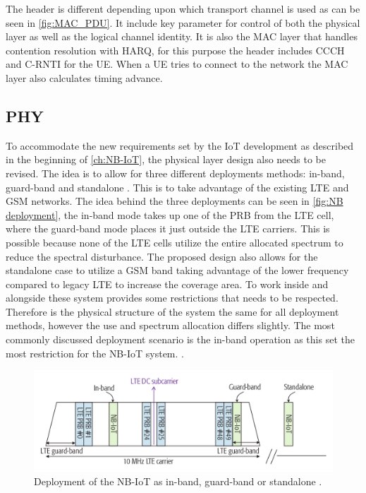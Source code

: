 The header is different depending upon which transport channel is used as can be seen in \autoref{fig:MAC_PDU}. It include key parameter for control of both the physical layer as well as the logical channel identity. It is also the \gls{MAC} layer that handles contention resolution with \gls{HARQ}, for this purpose the header includes \gls{CCCH} and \gls{C-RNTI} for the \gls{UE}. When a \gls{UE} tries to connect to the network the \gls{MAC} layer also calculates timing advance. 


\subsection{PHY}\label{sec:NB-IoT/Physical Layer}

To accommodate the new requirements set by the \gls{IoT} development as described in the beginning of \autoref{ch:NB-IoT}, the physical layer design also needs to be revised. The idea is to allow for three different deployments methods: in-band, guard-band and standalone \citep{primer}. This is to take advantage of the existing \gls{LTE} and \gls{GSM} networks. The idea behind the three deployments can be seen in \autoref{fig:NB deployment}, the in-band mode takes up one of the \gls{PRB} from the \gls{LTE} cell, where the guard-band mode places it just outside the LTE carriers. This is possible because none of the \gls{LTE} cells utilize the entire allocated spectrum to reduce the spectral disturbance. The proposed design also allows for the standalone case to utilize a \gls{GSM} band taking advantage of the lower frequency compared to legacy \gls{LTE} to increase the coverage area. To work inside and alongside these system provides some restrictions that needs to be respected. Therefore is the physical structure of the system the same for all deployment methods, however the use and spectrum allocation differs slightly. The most commonly discussed deployment scenario is the in-band operation as this set the most restriction for the \gls{NB-IoT} system. \citep{REL-13,primer}. 

\begin{figure}[H]
\centering
\includegraphics[width=\textwidth]{figures/deployment.png}
\caption{Deployment of the NB-IoT as in-band, guard-band or standalone \citep{primer}.}
\label{fig:NB deployment}
\end{figure}

